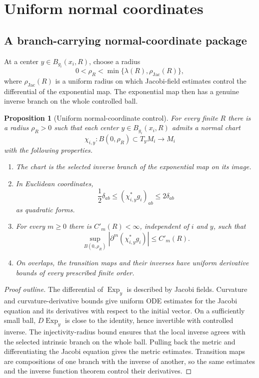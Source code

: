 \documentclass[11pt]{article}
\theoremstyle{plain}
\newtheorem{proposition}[theorem]{Proposition}
\theoremstyle{definition}
\theoremstyle{remark}
\newcommand{\Exp}{\operatorname{Exp}}
\newcommand{\del}{\delta}
\newcommand{\norm}[1]{\left|#1\right|}
\begin{document}
\section{Uniform normal coordinates}

\subsection{A branch-carrying normal-coordinate package}

At a center \(y\in B_{g_i}(x_i,R)\), choose a radius
\[
  0<\rho_R<
  \min\{\lambda(R),\rho_{\mathrm{Jac}}(R)\},
\]
where \(\rho_{\mathrm{Jac}}(R)\) is a uniform radius on which Jacobi-field
estimates control the differential of the exponential map.  The exponential
map then has a genuine inverse branch on the whole controlled ball.

\begin{proposition}[Uniform normal-coordinate control]\label{prop:h6}
For every finite \(R\) there is a radius \(\rho_R>0\) such that each center
\(y\in B_{g_i}(x_i,R)\) admits a normal chart
\[
  \chi_{i,y}:B(0,\rho_R)\subset T_yM_i\longrightarrow M_i
\]
with the following properties.
\begin{enumerate}[leftmargin=2em]
  \item The chart is the selected inverse branch of the exponential map on
  its image.
  \item In Euclidean coordinates,
  \[
    \frac12\del_{ab}\leq (\chi_{i,y}^*g_i)_{ab}\leq2\del_{ab}
  \]
  as quadratic forms.
  \item For every \(m\geq0\) there is \(C'_m(R)<\infty\), independent of
  \(i\) and \(y\), such that
  \[
    \sup_{B(0,\rho_R)}
    \norm{\partial^m(\chi_{i,y}^*g_i)}
    \leq C'_m(R).
  \]
  \item On overlaps, the transition maps and their inverses have uniform
  derivative bounds of every prescribed finite order.
\end{enumerate}
\end{proposition}

\begin{proof}[Proof outline]
The differential of \(\Exp_y\) is described by Jacobi fields.  Curvature and
curvature-derivative bounds give uniform ODE estimates for the Jacobi
equation and its derivatives with respect to the initial vector.  On a
sufficiently small ball, \(D\Exp_y\) is close to the identity, hence
invertible with controlled inverse.  The injectivity-radius bound ensures
that the local inverse agrees with the selected intrinsic branch on the
whole ball.  Pulling back the metric and differentiating the Jacobi equation
gives the metric estimates.  Transition maps are compositions of one branch
with the inverse of another, so the same estimates and the inverse function
theorem control their derivatives.
\end{proof}
\end{document}
